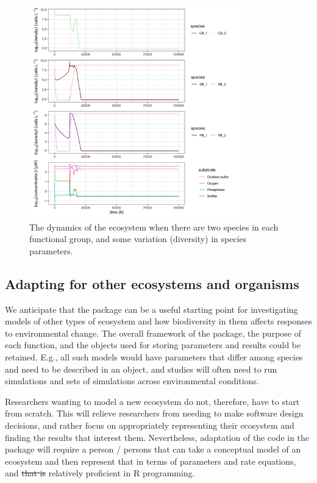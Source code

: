\documentclass[]{elsarticle} %
\providecommand{\DIFaddtex}[1]{{\protect\color{blue}\uwave{#1}}} %
\providecommand{\DIFdeltex}[1]{{\protect\color{red}\sout{#1}}}                      %
\providecommand{\DIFaddbegin}{} %
\providecommand{\DIFaddend}{} %
\providecommand{\DIFdelbegin}{} %
\providecommand{\DIFdelend}{} %
\providecommand{\DIFadd}[1]{\texorpdfstring{\DIFaddtex{#1}}{#1}} %
\providecommand{\DIFdel}[1]{\texorpdfstring{\DIFdeltex{#1}}{}} %
\newcommand{\DIFscaledelfig}{0.5}
\newlength{\DIFdelgraphicswidth} %
\newlength{\DIFdelgraphicsheight} %
\newcommand{\DIFaddincludegraphics}[2][]{{\color{blue}\fbox{\DIFOincludegraphics[#1]{#2}}}} %
\newcommand{\DIFdelincludegraphics}[2][]{%
\sbox{\DIFdelgraphicsbox}{\DIFOincludegraphics[#1]{#2}}%
\settoboxwidth{\DIFdelgraphicswidth}{\DIFdelgraphicsbox} %
\settoboxtotalheight{\DIFdelgraphicsheight}{\DIFdelgraphicsbox} %
\scalebox{\DIFscaledelfig}{%
\parbox[b]{\DIFdelgraphicswidth}{\usebox{\DIFdelgraphicsbox}\\[-\baselineskip] \rule{\DIFdelgraphicswidth}{0em}}\llap{\resizebox{\DIFdelgraphicswidth}{\DIFdelgraphicsheight}{%
\setlength{\unitlength}{\DIFdelgraphicswidth}%
\begin{picture}(1,1)%
\thicklines\linethickness{2pt} %
{\color[rgb]{1,0,0}\put(0,0){\framebox(1,1){}}}%
{\color[rgb]{1,0,0}\put(0,0){\line( 1,1){1}}}%
{\color[rgb]{1,0,0}\put(0,1){\line(1,-1){1}}}%
\end{picture}%
}\hspace*{3pt}}} %
} %
\DeclareRobustCommand{\DIFaddbegin}{\DIFOaddbegin \let\includegraphics\DIFaddincludegraphics} %
\DeclareRobustCommand{\DIFaddend}{\DIFOaddend \let\includegraphics\DIFOincludegraphics} %
\DeclareRobustCommand{\DIFdelbegin}{\DIFOdelbegin \let\includegraphics\DIFdelincludegraphics} %
\DeclareRobustCommand{\DIFdelend}{\DIFOaddend \let\includegraphics\DIFOincludegraphics} %
\begin{document}
\begin{figure}

{\centering \includegraphics[width=350px]{figures/uc3_supplement_5_4} 

}

\caption{The dynamics of the ecosystem when there are two species in each functional group, and some variation (diversity) in species parameters.}\label{fig:uc3}
\end{figure}

\hypertarget{adapting-for-other-ecosystems-and-organisms}{%
\subsection{Adapting for other ecosystems and organisms}\label{adapting-for-other-ecosystems-and-organisms}}

We anticipate that the package can be a useful starting point for investigating models of other types of ecosystem and how biodiversity in them affects responses to environmental change. The overall framework of the package, the purpose of each function, and the objects used for storing parameters and results could be retained. E.g., all such models would have parameters that differ among species and need to be described in an object, and studies will often need to run simulations and sets of simulations across environmental conditions.

Researchers wanting to model a new ecosystem do not, therefore, have to start from scratch. This will relieve researchers from needing to make software design decisions, and rather focus on appropriately representing their ecosystem and finding the results that interest them. Nevertheless, adaptation of the code in the package will require a person / persons that can take a conceptual model of an ecosystem and then represent that in terms of parameters and rate equations, and \DIFdelbegin \DIFdel{that
is }\DIFdelend \DIFaddbegin \DIFadd{a person or persons }\DIFaddend relatively proficient in R programming.
\end{document}
